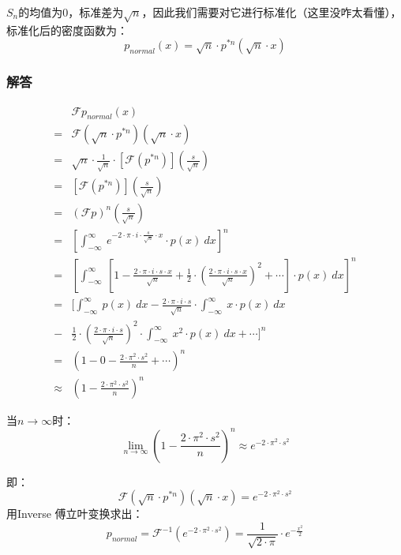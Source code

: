 $S_n$的均值为$0$，标准差为$\sqrt{n}$，因此我们需要对它进行标准化（这里没咋太看懂），标准化后的密度函数为：
$$
	p_{normal}(x)=\sqrt{n}\cdot p^{*n}(\sqrt{n}\cdot x)
$$
\subsubsection{解答}
\begin{align*}
	        & \mathcal{F}p_{normal}(x)                                                                                                                                                     \\
	=       & \mathcal{F}(\sqrt{n}\cdot p^{*n})(\sqrt{n}\cdot x)                                                                                                                           \\
	=       & \sqrt{n}\cdot\frac{1}{\sqrt{n}}\cdot [\mathcal{F}(p^{*n})](\frac{s}{\sqrt{n}})                                                                                               \\
	=       & [\mathcal{F}(p^{*n})](\frac{s}{\sqrt{n}})                                                                                                                                    \\
	=       & (\mathcal{F}p)^n(\frac{s}{\sqrt{n}})                                                                                                                                         \\
	=       & [\int_{-\infty}^{\infty}\ e^{-2\cdot \pi\cdot i\cdot \frac{s}{\sqrt{n}}\cdot x}\cdot p(x)\ dx]^n                                                                             \\
	=       & [\int_{-\infty}^{\infty}\ [1-\frac{2\cdot \pi\cdot i\cdot s\cdot x}{\sqrt{n}}+\frac{1}{2}\cdot (\frac{2\cdot \pi\cdot i\cdot s\cdot x}{\sqrt{n}})^2+\cdots]\cdot p(x)\ dx]^n \\
	=       & [\int_{-\infty}^{\infty}\ p(x)\ dx-\frac{2\cdot \pi\cdot i\cdot s}{\sqrt{n}}\cdot \int_{-\infty}^{\infty}\ x\cdot p(x)\ dx                                                   \\
	-       & \frac{1}{2}\cdot (\frac{2\cdot \pi\cdot i\cdot s}{\sqrt{n}})^2\cdot \int_{-\infty}^{\infty}\ x^2\cdot p(x)\ dx+\cdots]^n                                                     \\
	=       & (1-0-\frac{2\cdot\pi^2\cdot s^2}{n}+\cdots)^n                                                                                                                                \\
	\approx & (1-\frac{2\cdot \pi^2\cdot s^2}{n})^n
\end{align*}

当$n\rightarrow\infty$时：
$$
	\lim\limits_{n\rightarrow\infty}(1-\frac{2\cdot \pi^2\cdot s^2}{n})^n\approx e^{-2\cdot\pi^2\cdot s^2}
$$

即：
$$
	\mathcal{F}(\sqrt{n}\cdot p^{*n})(\sqrt{n}\cdot x)=e^{-2\cdot\pi^2\cdot s^2}
$$
用Inverse 傅立叶变换求出：
\begin{equation}
	p_{normal}=\mathcal{F}^{-1}(e^{-2\cdot\pi^2\cdot s^2})=\frac{1}{\sqrt{2\cdot \pi}}\cdot e^{-\frac{x^2}{2}}
\end{equation}